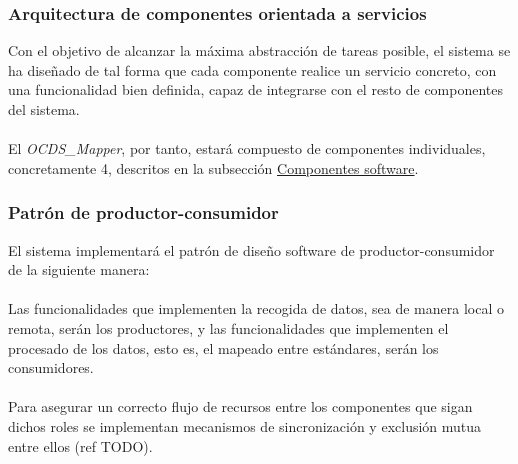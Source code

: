         \subsubsection{Arquitectura de componentes orientada a servicios}
            Con el objetivo de alcanzar la máxima abstracción de tareas posible, el sistema se ha diseñado de tal forma que cada componente realice un servicio concreto, con una funcionalidad bien definida, capaz de integrarse con el resto de componentes del sistema.
            \\ \\
            El \textit{OCDS\_Mapper}, por tanto, estará compuesto de componentes individuales, concretamente 4, descritos en la subsección \hyperref[subsubsec:componentes]{Componentes software}.
            
        \subsubsection{Patrón de productor-consumidor}
            El sistema implementará el patrón de diseño software de productor-consumidor de la siguiente manera:
            \\ \\
            Las funcionalidades que implementen la recogida de datos, sea de manera local o remota, serán los productores, y las funcionalidades que implementen el procesado de los datos, esto es, el mapeado entre estándares, serán los consumidores.
            \\ \\
            Para asegurar un correcto flujo de recursos entre los componentes que sigan dichos roles se implementan mecanismos de sincronización y exclusión mutua entre ellos (ref TODO).
        
